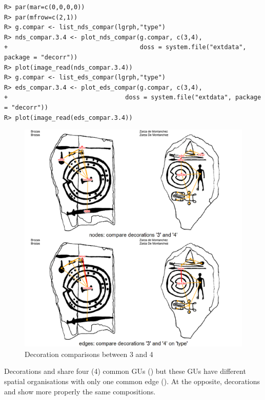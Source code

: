 \documentclass[article]{jss}\usepackage{knitr}
\begin{document}
\begin{kframe}
\begin{verbatim}
R> par(mar=c(0,0,0,0))
R> par(mfrow=c(2,1))
R> g.compar <- list_nds_compar(lgrph,"type")
R> nds_compar.3.4 <- plot_nds_compar(g.compar, c(3,4),
+                                    doss = system.file("extdata", package = "decorr"))
R> plot(image_read(nds_compar.3.4))
R> g.compar <- list_eds_compar(lgrph,"type")
R> eds_compar.3.4 <- plot_eds_compar(g.compar, c(3,4),
+                                doss = system.file("extdata", package = "decorr"))
R> plot(image_read(eds_compar.3.4))
\end{verbatim}
\end{kframe}\begin{figure}[H]

{\centering \includegraphics[width=\maxwidth]{figure/unnamed-chunk-17-1} 

}

\caption{\label{fig:figs}Decoration comparisons between 3 and 4}\label{fig:unnamed-chunk-17}
\end{figure}



Decorations  and  share four (4) common GUs () but  these GUs have different spatial organisations with only one common edge (). At the opposite, decorations  and  show more properly the same compositions.
\end{document}
